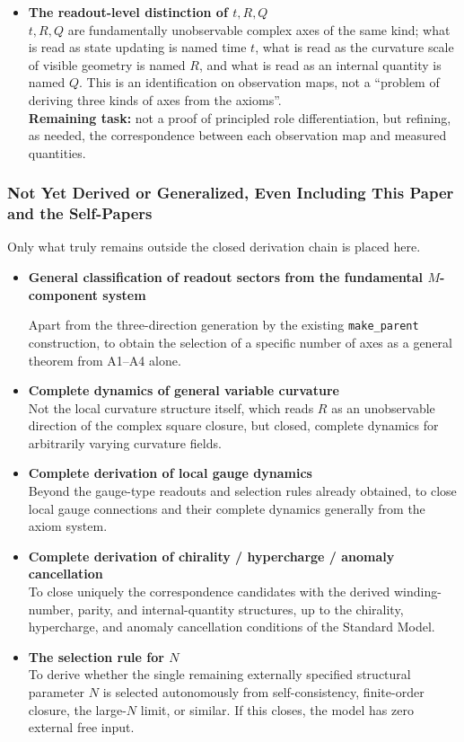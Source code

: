 \documentclass[
  a4paper,
]{article}
\begin{document}
\begin{itemize}
\item
  \textbf{The readout-level distinction of \(t,R,Q\)}\\
  \(t,R,Q\) are fundamentally unobservable complex axes of the same
  kind; what is read as state updating is named time \(t\), what is read
  as the curvature scale of visible geometry is named \(R\), and what is
  read as an internal quantity is named \(Q\). This is an identification
  on observation maps, not a ``problem of deriving three kinds of axes
  from the axioms''.\\
  \textbf{Remaining task:} not a proof of principled role
  differentiation, but refining, as needed, the correspondence between
  each observation map and measured quantities.
\end{itemize}

\subsubsection{Not Yet Derived or Generalized, Even Including This Paper
and the
Self-Papers}\label{not-yet-derived-or-generalized-even-including-this-paper-and-the-self-papers}

Only what truly remains outside the closed derivation chain is placed
here.

\begin{itemize}
\item
  \textbf{General classification of readout sectors from the fundamental
  \(M\)-component system}

  Apart from the three-direction generation by the existing
  \texttt{make\_parent} construction, to obtain the selection of a
  specific number of axes as a general theorem from A1--A4 alone.
\item
  \textbf{Complete dynamics of general variable curvature}\\
  Not the local curvature structure itself, which reads \(R\) as an
  unobservable direction of the complex square closure, but closed,
  complete dynamics for arbitrarily varying curvature fields.
\item
  \textbf{Complete derivation of local gauge dynamics}\\
  Beyond the gauge-type readouts and selection rules already obtained,
  to close local gauge connections and their complete dynamics generally
  from the axiom system.
\item
  \textbf{Complete derivation of chirality / hypercharge / anomaly
  cancellation}\\
  To close uniquely the correspondence candidates with the derived
  winding-number, parity, and internal-quantity structures, up to the
  chirality, hypercharge, and anomaly cancellation conditions of the
  Standard Model.
\item
  \textbf{The selection rule for \(N\)}\\
  To derive whether the single remaining externally specified structural
  parameter \(N\) is selected autonomously from self-consistency,
  finite-order closure, the large-\(N\) limit, or similar. If this
  closes, the model has zero external free input.
\end{itemize}
\end{document}
